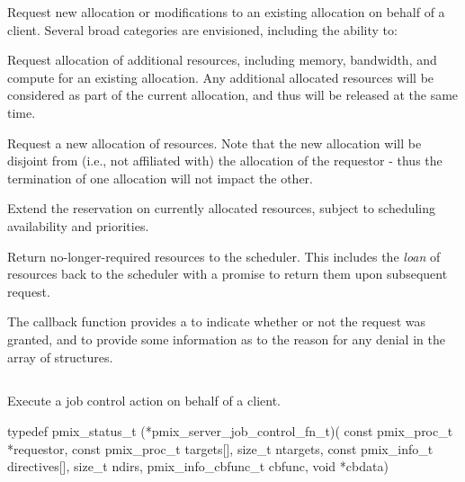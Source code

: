 Request new allocation or modifications to an existing allocation on behalf of a client. Several broad categories are envisioned, including the ability to:

\begin{compactitem}
%
\item Request allocation of additional resources, including memory, bandwidth, and compute for an existing allocation. Any additional allocated resources will be considered as part of the current allocation, and thus will be released at the same time.
%
\item Request a new allocation of resources. Note that the new allocation will be disjoint from (i.e., not affiliated with) the allocation of the requestor - thus the termination of one allocation will not impact the other.
%
\item Extend the reservation on currently allocated resources, subject to scheduling availability and priorities.
%
\item Return no-longer-required resources to the scheduler.
This includes the \textit{loan} of resources back to the scheduler with a promise to return them upon subsequent request.
\end{compactitem}

The callback function provides a  to indicate whether or not the request was granted, and to provide some information as to the reason for any denial in the  array of  structures.


\subsection{}

\summary

Execute a job control action on behalf of a client.

\format

\cspecificstart
\begin{codepar}
typedef pmix_status_t (*pmix_server_job_control_fn_t)(
                             const pmix_proc_t *requestor,
                             const pmix_proc_t targets[], size_t ntargets,
                             const pmix_info_t directives[], size_t ndirs,
                             pmix_info_cbfunc_t cbfunc, void *cbdata)
\end{codepar}
\cspecificend

